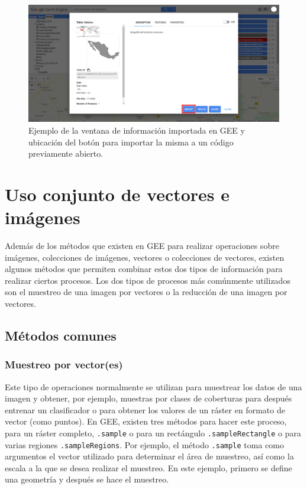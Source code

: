 \documentclass[
  12pt,
  letterpaper,
  twoside]{book}
\begin{document}
\begin{figure}[btp]

{\centering \includegraphics[width=1\linewidth]{Img/Asset_ruta2} 

}

\caption{Ejemplo de la ventana de información importada en GEE y ubicación del botón para importar la misma a un código previamente abierto.}\label{fig:unnamed-chunk-180}
\end{figure}

\newpage

\hypertarget{uso-conjunto-de-vectores-e-imuxe1genes}{%
\chapter{Uso conjunto de vectores e imágenes}\label{uso-conjunto-de-vectores-e-imuxe1genes}}

Además de los métodos que existen en GEE para realizar operaciones sobre imágenes, colecciones de imágenes, vectores o colecciones de vectores, existen algunos métodos que permiten combinar estos dos tipos de información para realizar ciertos procesos. Los dos tipos de procesos más comúnmente utilizados son el muestreo de una imagen por vectores o la reducción de una imagen por vectores.

\hypertarget{muxe9todos-comunes-5}{%
\section{Métodos comunes}\label{muxe9todos-comunes-5}}

\hypertarget{muestreo-por-vectores}{%
\subsection{Muestreo por vector(es)}\label{muestreo-por-vectores}}

Este tipo de operaciones normalmente se utilizan para muestrear los datos de una imagen y obtener, por ejemplo, muestras por clases de coberturas para después entrenar un clasificador o para obtener los valores de un ráster en formato de vector (como puntos). En GEE, existen tres métodos para hacer este proceso, para un ráster completo, \texttt{.sample} o para un rectángulo \texttt{.sampleRectangle} o para varias regiones \texttt{.sampleRegions}. Por ejemplo, el método \texttt{.sample} toma como argumentos el vector utilizado para determinar el área de muestreo, así como la escala a la que se desea realizar el muestreo. En este ejemplo, primero se define una geometría y después se hace el muestreo.
\end{document}
